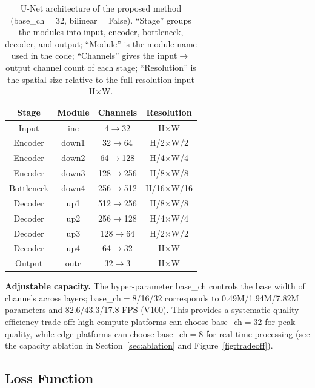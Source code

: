 \documentclass[remotesensing,article,accept,moreauthors]{Definitions/mdpi}
\begin{document}
\begin{table}[H]
\centering
\caption{U-Net architecture of the proposed method (base\_ch$=$32, bilinear$=$False). ``Stage'' groups the modules into input, encoder, bottleneck, decoder, and output; ``Module'' is the module name used in the code; ``Channels'' gives the input$\rightarrow$output channel count of each stage; ``Resolution'' is the spatial size relative to the full-resolution input H$\times$W.}
\label{tab:arch}
\begin{tabularx}{\textwidth}{CCCC}
\toprule
Stage & Module & Channels & Resolution \\
\midrule
Input & inc & 4$\rightarrow$32 & H$\times$W \\
Encoder & down1 & 32$\rightarrow$64 & H/2$\times$W/2 \\
Encoder & down2 & 64$\rightarrow$128 & H/4$\times$W/4 \\
Encoder & down3 & 128$\rightarrow$256 & H/8$\times$W/8 \\
Bottleneck & down4 & 256$\rightarrow$512 & H/16$\times$W/16 \\
Decoder & up1 & 512$\rightarrow$256 & H/8$\times$W/8 \\
Decoder & up2 & 256$\rightarrow$128 & H/4$\times$W/4 \\
Decoder & up3 & 128$\rightarrow$64 & H/2$\times$W/2 \\
Decoder & up4 & 64$\rightarrow$32 & H$\times$W \\
Output & outc & 32$\rightarrow$3 & H$\times$W \\
\bottomrule
\end{tabularx}
\end{table}

\textbf{Adjustable capacity.} The hyper-parameter base\_ch controls the base width of channels across layers; base\_ch$=$8/16/32 corresponds to 0.49M/1.94M/7.82M parameters and 82.6/43.3/17.8 FPS (V100). This provides a systematic quality--efficiency trade-off: high-compute platforms can choose base\_ch$=$32 for peak quality, while edge platforms can choose base\_ch$=$8 for real-time processing (see the capacity ablation in Section~\ref{sec:ablation} and Figure~\ref{fig:tradeoff}).

\subsection{Loss Function}
\end{document}
